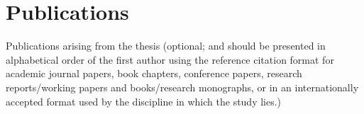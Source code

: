 \chapter*{Publications}
\label{ch:publication}

Publications arising from the thesis (optional; and should be presented in alphabetical order of the first author using the reference citation format for academic journal papers, book chapters, conference papers, research reports/working papers and books/research monographs, or in an internationally accepted format used by the discipline in which the study lies.)